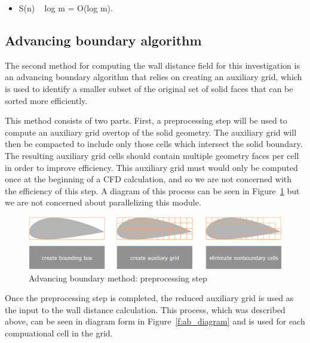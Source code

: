 \documentclass[]{aiaa-tc}%
\begin{document}
\begin{itemize}
  \item S(n) ~ log m = O(log m).
\end{itemize}

\subsection{Advancing boundary algorithm}
The second method for computing the wall distance field for this
investigation is an advancing boundary algorithm that relies on creating an
auxiliary grid, which is used to identify a smaller subset of the
original set of solid faces that can be sorted more efficiently.

This method consists of two parts. First, a preprocessing step will be
used to compute an auxiliary grid overtop of the solid geometry. The
auxiliary grid will then be compacted to include only those cells
which intersect the solid boundary. The resulting auxiliary grid cells
should contain multiple geometry faces per cell in order to improve
efficiency. This auxiliary grid must would only be computed once at the
beginning of a CFD calculation, and so we are not concerned with the
efficiency of this step. A diagram of this process can be seen in
Figure~\ref{f:ab_preprocessor_diagram} but we are not concerned about
parallelizing this module.

\begin{figure}
  \includegraphics{figures/preprocessor/preprocessor_diagram}
  \caption{Advancing boundary method: preprocessing step}
  \label{f:ab_preprocessor_diagram}
\end{figure}


Once the preprocessing step is completed, the reduced auxiliary grid
is used as the input to the wall distance calculation. This process,
which was described above, can be seen in diagram form in
Figure~\ref{f:ab_diagram} and is used for each compuational cell in
the grid.
\end{document}
